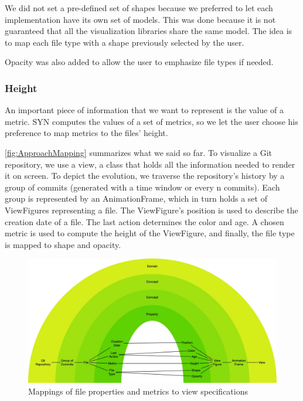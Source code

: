 We did not set a pre-defined set of shapes because we preferred to let each implementation have its own set of models. This was done because it is not guaranteed that all the visualization libraries share the same model. The idea is to map each file type with a shape previously selected by the user. 

Opacity was also added to allow the user to emphasize file types if needed. 


\subsubsection*{Height}
An important piece of information that we want to represent is the value of a metric. SYN computes the values of a set of metrics, so we let the user choose his preference to map metrics to the files' height. 


\autoref{fig:ApproachMapping} summarizes what we said so far. To visualize a Git repository, we use a view, a class that holds all the information needed to render it on screen. To depict the evolution, we traverse the repository's history by a group of commits (generated with a time window or every n commits). Each group is represented by an AnimationFrame, which in turn holds a set of ViewFigures representing a file. The ViewFigure's position is used to describe the creation date of a file. The last action determines the color and age. A chosen metric is used to compute the height of the ViewFigure, and finally, the file type is mapped to shape and opacity. 


\begin{figure}
    \center
    \includegraphics[width=\textwidth]{ApproachMapping.jpg}
    \caption{Mappings of file properties and metrics to view specifications}
    \label{fig:ApproachMapping}
\end{figure}


